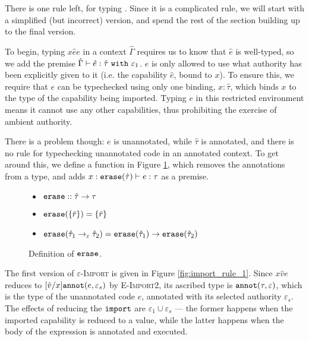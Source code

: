 There is one rule left, for typing . Since it is a complicated
rule, we will start with a simplified (but incorrect) version, and spend the
rest of the section building up to the final version.

To begin, typing ${x}{\hat e}{e}$ in a context
$\hat \Gamma$ requires us to know that $\hat e$ is
well-typed, so we add the premise
$\hat \Gamma \vdash \hat e: \hat \tau~\mathtt{with}~ \varepsilon_1$.
$e$ is only allowed to use what authority has been explicitly given to it
(i.e. the capability $\hat e$, bound to $x$). To ensure this, we require
that $e$ can be typechecked using only one binding, $x: \hat \tau$,
which binds $x$ to the type of the capability being imported.
Typing $e$ in this restricted environment means it cannot use any
other capabilities, thus prohibiting the exercise of ambient authority.

There is a problem though: $e$ is unannotated, while $\hat \tau$ is
annotated, and there is no rule for typechecking unannotated code in
an annotated context. To get around this, we define a function
 in Figure \ref{fig:erase_defn}, which removes the
annotations from a type, and adds
$x: \mathtt{erase}(\hat \tau) \vdash e: \tau$ as a premise.

\begin{figure}
\vspace*{-5mm}
\begin{itemize}
	\setlength\itemsep{-0.2em}
\item[] $\mathtt{erase} :: \hat \tau \rightarrow \tau$
	\item[] $\mathtt{erase}(\{ \bar r \}) = \{ \bar r \}$
	\item[] $\mathtt{erase}(\hat \tau_1 \rightarrow_{\varepsilon} \hat \tau_2) = \mathtt{erase}(\hat \tau_1) \rightarrow \mathtt{erase}(\hat \tau_2)$
\end{itemize}
\vspace*{-5mm}
\caption{Definition of $\mathtt{erase}$.}
\vspace*{-5mm}
\label{fig:erase_defn}
\end{figure}

The first version of \textsc{$\varepsilon$-Import} is given in Figure
\ref{fig:import_rule_1}. Since
${x}{\hat v}{e}$ reduces to $[\hat
v/x]\mathtt{annot}(e, \varepsilon_s)$ by \textsc{E-Import2}, its ascribed type is $\mathtt{annot}(\tau, \varepsilon)$, which is the type of the unannotated
code $e$, annotated with its selected authority $\varepsilon_s$. The
effects of reducing the $\mathtt{import}$ are $\varepsilon_1 \cup \varepsilon_s$
--- the former happens when the imported capability is reduced to a value,
while the latter happens when the body of the  expression is
annotated and executed.

